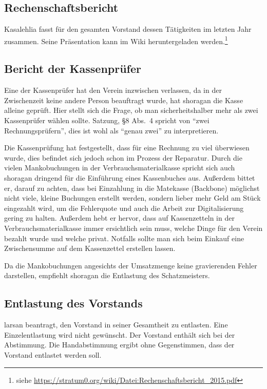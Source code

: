\documentclass[a4paper,12pt]{scrartcl}
\begin{document}


\subsection{Rechenschaftsbericht}
Kasalehlia fasst für den gesamten Vorstand dessen Tätigkeiten im letzten Jahr
zusammen. Seine Präsentation kann im Wiki heruntergeladen
werden.\footnote{siehe
\url{https://stratum0.org/wiki/Datei:Rechenschaftsbericht_2015.pdf}}

\subsection{Bericht der Kassenprüfer}
Eine der Kassenprüfer hat den Verein inzwischen verlassen, da in der
Zwischenzeit keine andere Person beauftragt wurde, hat shoragan die Kasse
alleine geprüft. Hier stellt sich die Frage, ob man sicherheitshalber mehr als
zwei Kassenprüfer wählen sollte. Satzung, §8 Abs.~4 spricht von "`zwei
Rechnungsprüfern"', dies ist wohl als "`genau zwei"' zu interpretieren.

Die Kassenprüfung hat festgestellt, dass für eine Rechnung zu viel überwiesen
wurde, dies befindet sich jedoch schon im Prozess der Reparatur. Durch die
vielen Mankobuchungen in der Verbrauchsmaterialkasse spricht sich auch shoragan
dringend für die Einführung eines Kassenbuches aus. Außerdem bittet er, darauf zu
achten, dass bei Einzahlung in die Matekasse (Backbone) möglichst nicht viele, kleine
Buchungen erstellt werden, sondern lieber mehr Geld am Stück eingezahlt wird, um
die Fehlerquote und auch die Arbeit zur Digitalisierung gering zu halten.
Außerdem hebt er hervor, dass auf Kassenzetteln in der Verbrauchsmaterialkasse
immer ersichtlich sein muss,
welche Dinge für den Verein bezahlt wurde und welche privat. Notfalls sollte man
sich beim Einkauf eine Zwischensumme auf dem Kassenzettel erstellen lassen.

Da die Mankobuchungen angesichts der Umsatzmenge keine gravierenden Fehler
darstellen, empfiehlt shoragan die Entlastung des Schatzmeisters.

\subsection{Entlastung des Vorstands}
larsan beantragt, den Vorstand in seiner Gesamtheit zu entlasten. Eine
Einzelentlastung wird nicht gewünscht. Der Vorstand enthält sich bei der
Abstimmung. Die Handabstimmung ergibt ohne Gegenstimmen, dass der Vorstand
entlastet werden soll.
\end{document}
